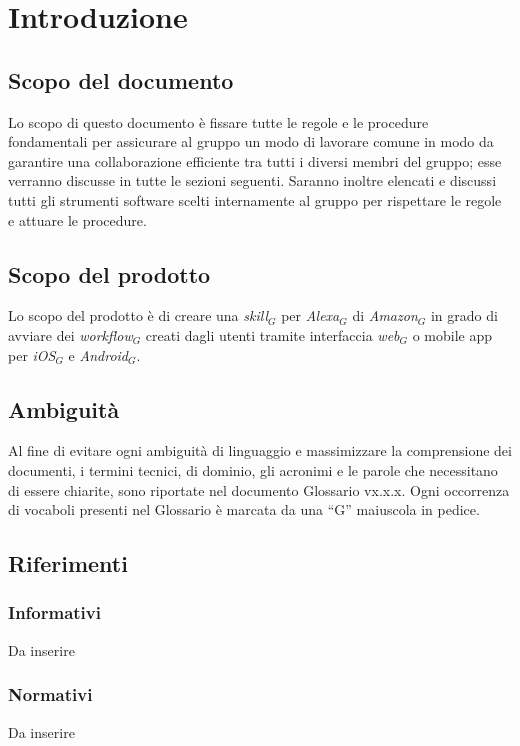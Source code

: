 \newpage
\section{Introduzione}
\subsection{Scopo del documento}
Lo scopo di questo documento è fissare tutte le regole e le procedure fondamentali per assicurare al gruppo un modo di lavorare comune in modo da garantire una collaborazione efficiente tra tutti i diversi membri del gruppo; esse verranno discusse in tutte le sezioni seguenti.
Saranno inoltre elencati e discussi tutti gli strumenti software scelti internamente al gruppo per rispettare le regole e attuare le procedure.


\subsection{Scopo del prodotto}
Lo scopo del prodotto è di creare una \textit{skill$_{G}$} per \textit{Alexa$_{G}$} di \textit{Amazon$_{G}$} in grado di avviare dei \textit{workflow$_{G}$} creati dagli utenti tramite interfaccia \textit{web$_{G}$} o mobile app per \textit{iOS$_{G}$} e \textit{Android$_{G}$}.
\subsection{Ambiguità}
Al fine di evitare ogni ambiguità di linguaggio e massimizzare la comprensione dei
documenti, i termini tecnici, di dominio, gli acronimi e le parole che necessitano di
essere chiarite, sono riportate nel documento Glossario vx.x.x.
Ogni occorrenza di vocaboli presenti nel Glossario è marcata da una “G” maiuscola in
pedice.
\subsection{Riferimenti}
\subsubsection{Informativi}
Da inserire
\subsubsection{Normativi}
Da inserire